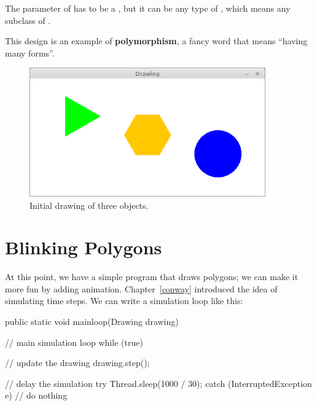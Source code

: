 The parameter of  has to be a , but it can be any type of , which means any subclass of .


This design is an example of {\bf polymorphism}, a fancy word that means ``having many forms''.


\begin{figure}[!ht]
\begin{center}
\includegraphics[width=4in]{figs/drawing.png}
\caption{Initial drawing of three  objects.}
\label{fig:drawing}
\end{center}
\end{figure}



\section{Blinking Polygons}
\label{sec:blinking}

At this point, we have a simple program that draws polygons; we can make it more fun by adding animation.
Chapter~\ref{conway} introduced the idea of simulating time steps.
We can write a simulation loop like this:

\begin{code}
    public static void mainloop(Drawing drawing) {
        // main simulation loop
        while (true) {

            // update the drawing
            drawing.step();

            // delay the simulation
            try {
                Thread.sleep(1000 / 30);
            } catch (InterruptedException e) {
                // do nothing
            }
        }
    }
\end{code}

